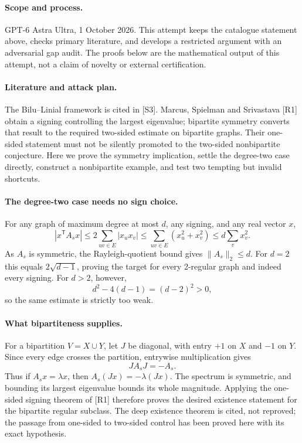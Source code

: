 \documentclass[11pt,a4paper]{article}
\begin{document}
\paragraph{Scope and process.}
GPT-6 Astra Ultra, 1 October 2026. This attempt keeps the catalogue statement above, checks primary literature, and develops a restricted argument with an adversarial gap audit. The proofs below are the mathematical output of this attempt, not a claim of novelty or external certification.

\paragraph{Literature and attack plan.}
The Bilu--Linial framework is cited in [S3]. Marcus, Spielman and Srivastava [R1] obtain a signing controlling the largest eigenvalue; bipartite symmetry converts that result to the required two-sided estimate on bipartite graphs. Their one-sided statement must not be silently promoted to the two-sided nonbipartite conjecture. Here we prove the symmetry implication, settle the degree-two case directly, construct a nonbipartite example, and test two tempting but invalid shortcuts.

\paragraph{The degree-two case needs no sign choice.}
For any graph of maximum degree at most $d$, any signing, and any real vector $x$,
\[
 |x^{\mathsf T}A_sx|
 \le2\sum_{uv\in E}|x_ux_v|
 \le\sum_{uv\in E}(x_u^2+x_v^2)
 \le d\sum_vx_v^2. \tag{1}
\]
As $A_s$ is symmetric, the Rayleigh-quotient bound gives $\|A_s\|_2\le d$. For $d=2$ this equals $2\sqrt{d-1}$, proving the target for every 2-regular graph and indeed every signing. For $d>2$, however,
\[
 d^2-4(d-1)=(d-2)^2>0,
\]
so the same estimate is strictly too weak.

\paragraph{What bipartiteness supplies.}
For a bipartition $V=X\cup Y$, let $J$ be diagonal, with entry $+1$ on $X$ and $-1$ on $Y$. Since every edge crosses the partition, entrywise multiplication gives
\[
 JA_sJ=-A_s.
\]
Thus if $A_sx=\lambda x$, then $A_s(Jx)=-\lambda(Jx)$. The spectrum is symmetric, and bounding its largest eigenvalue bounds its whole magnitude. Applying the one-sided signing theorem of [R1] therefore proves the desired existence statement for the bipartite regular subclass. The deep existence theorem is cited, not reproved; the passage from one-sided to two-sided control has been proved here with its exact hypothesis.
\end{document}
